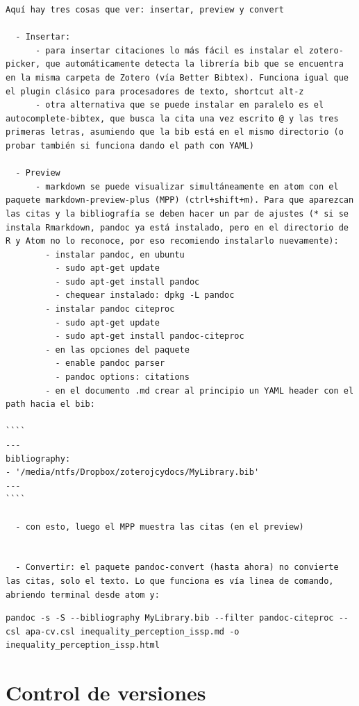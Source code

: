 \documentclass[11pt,]{book}
\begin{document}
\begin{verbatim}
Aquí hay tres cosas que ver: insertar, preview y convert

  - Insertar:
      - para insertar citaciones lo más fácil es instalar el zotero-picker, que automáticamente detecta la librería bib que se encuentra en la misma carpeta de Zotero (vía Better Bibtex). Funciona igual que el plugin clásico para procesadores de texto, shortcut alt-z
      - otra alternativa que se puede instalar en paralelo es el autocomplete-bibtex, que busca la cita una vez escrito @ y las tres primeras letras, asumiendo que la bib está en el mismo directorio (o probar también si funciona dando el path con YAML)

  - Preview
      - markdown se puede visualizar simultáneamente en atom con el paquete markdown-preview-plus (MPP) (ctrl+shift+m). Para que aparezcan las citas y la bibliografía se deben hacer un par de ajustes (* si se instala Rmarkdown, pandoc ya está instalado, pero en el directorio de R y Atom no lo reconoce, por eso recomiendo instalarlo nuevamente):
        - instalar pandoc, en ubuntu
          - sudo apt-get update
          - sudo apt-get install pandoc
          - chequear instalado: dpkg -L pandoc
        - instalar pandoc citeproc
          - sudo apt-get update
          - sudo apt-get install pandoc-citeproc
        - en las opciones del paquete
          - enable pandoc parser
          - pandoc options: citations
        - en el documento .md crear al principio un YAML header con el path hacia el bib:

````
---
bibliography:
- '/media/ntfs/Dropbox/zoterojcydocs/MyLibrary.bib'
---
````

  - con esto, luego el MPP muestra las citas (en el preview)


  - Convertir: el paquete pandoc-convert (hasta ahora) no convierte las citas, solo el texto. Lo que funciona es vía linea de comando, abriendo terminal desde atom y:
\end{verbatim}

\begin{verbatim}
pandoc -s -S --bibliography MyLibrary.bib --filter pandoc-citeproc --csl apa-cv.csl inequality_perception_issp.md -o inequality_perception_issp.html
\end{verbatim}

\hypertarget{control-de-versiones}{%
\section{Control de versiones}\label{control-de-versiones}}
\end{document}
